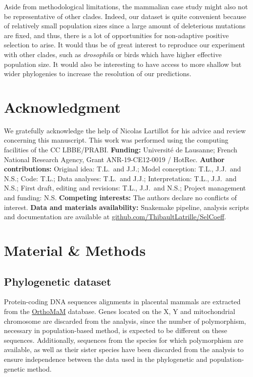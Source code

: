\documentclass{article}
\begin{document}
    Aside from methodological limitations, the mammalian case study might also not be representative of other clades.
    Indeed, our dataset is quite convenient because of relatively small population sizes since a large amount of deleterious mutations are fixed, and thus, there is a lot of opportunities for non-adaptive positive selection to arise.
    It would thus be of great interest to reproduce our experiment with other clades, such as \textit{drosophila} or birds which have higher effective population size.
    It would also be interesting to have access to more shallow but wider phylogenies to increase the resolution of our predictions.


    \section*{Acknowledgment}
    \label{sec:acknowledgment}
    We gratefully acknowledge the help of Nicolas Lartillot for his advice and review concerning this manuscript.
    This work was performed using the computing facilities of the CC LBBE/PRABI\@.
    \textbf{Funding:}
    Université de Lausanne;
    French National Research Agency, Grant ANR-19-CE12-0019 / HotRec.
    \textbf{Author contributions:}
    Original idea: T.L.\ and J.J.;
    Model conception: T.L., J.J.\ and N.S.;
    Code: T.L.;
    Data analyses: T.L.\ and J.J.;
    Interpretation: T.L., J.J.\ and N.S.;
    First draft, editing and revisions: T.L., J.J.\ and N.S.;
    Project management and funding: N.S\@.
    \textbf{Competing interests:}
    The authors declare no conflicts of interest.
    \textbf{Data and materials availability:}
    Snakemake pipeline, analysis scripts and documentation are available at \href{https://github.com/ThibaultLatrille/SelCoeff}{github.com/ThibaultLatrille/SelCoeff}.


    \section{Material \& Methods}
    \label{sec:methods}

    \subsection{Phylogenetic dataset}

    Protein-coding DNA sequences alignments in placental mammals are extracted from the \href{https://www.orthomam.univ-montp2.fr}{OrthoMaM} database\cite{ranwez_orthomam_2007, douzery_orthomam_2014, scornavacca_orthomam_2019}.
    Genes located on the X, Y and mitochondrial chromosome are discarded from the analysis, since the number of polymorphism, necessary in population-based method, is expected to be different on these sequences.
    Additionally, sequences from the species for which polymorphism are available, as well as their sister species have been discarded from the analysis to ensure independence between the data used in the phylogenetic and population-genetic method.
\end{document}
